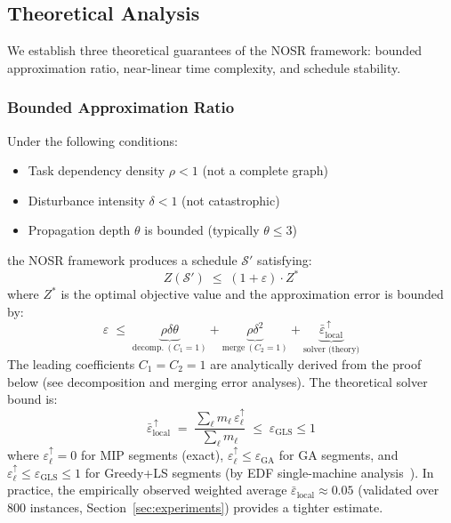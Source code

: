 \documentclass[manuscript,screen,review]{acmart}
\begin{document}
\subsection{Theoretical Analysis}
\label{subsec:theory}

We establish three theoretical guarantees of the NOSR framework: bounded
approximation ratio, near-linear time complexity, and schedule stability.

\subsubsection{Bounded Approximation Ratio}

\begin{theorem}
\label{thm:bounded-suboptimality}
Under the following conditions:
\begin{itemize}[leftmargin=*, nosep]
  \item Task dependency density $\rho < 1$ (not a complete graph)
  \item Disturbance intensity $\delta < 1$ (not catastrophic)
  \item Propagation depth $\theta$ is bounded (typically $\theta \leq 3$)
\end{itemize}
the NOSR framework produces a schedule $\mathcal{S}'$ satisfying:
\begin{equation}
  Z(\mathcal{S}') \;\leq\; (1 + \varepsilon) \cdot Z^*
  \label{eq:approx_ratio}
\end{equation}
where $Z^*$ is the optimal objective value and the approximation error
is bounded by:
\begin{equation}
  \varepsilon \;\leq\;
  \underbrace{\rho\delta\theta}_{\text{decomp.}\ (C_1=1)}
  +\underbrace{\rho\delta^2}_{\text{merge}\ (C_2=1)}
  +\underbrace{\bar{\varepsilon}_{\mathrm{local}}^{\,\uparrow}}_{\text{solver (theory)}}
  \label{eq:epsilon}
\end{equation}
The leading coefficients $C_1 = C_2 = 1$ are analytically derived
from the proof below (see decomposition and merging error analyses).
The theoretical solver bound is:
\begin{equation}
  \bar{\varepsilon}_{\mathrm{local}}^{\,\uparrow}
  \;=\;
  \frac{\sum_{\ell} m_\ell \,\varepsilon_\ell^{\uparrow}}{\sum_\ell m_\ell}
  \;\leq\; \varepsilon_{\mathrm{GLS}} \leq 1
  \label{eq:eps_local_theory}
\end{equation}
where $\varepsilon_\ell^{\uparrow} = 0$ for MIP segments (exact),
$\varepsilon_\ell^{\uparrow} \leq \varepsilon_{\mathrm{GA}}$ for GA segments,
and $\varepsilon_\ell^{\uparrow} \leq \varepsilon_{\mathrm{GLS}} \leq 1$
for Greedy+LS segments (by EDF single-machine analysis~\cite{pinedo2012scheduling}).
In practice, the empirically observed weighted average
$\bar{\varepsilon}_{\mathrm{local}} \approx 0.05$ (validated over 800
instances, Section~\ref{sec:experiments}) provides a tighter estimate.
\end{theorem}
\end{document}
